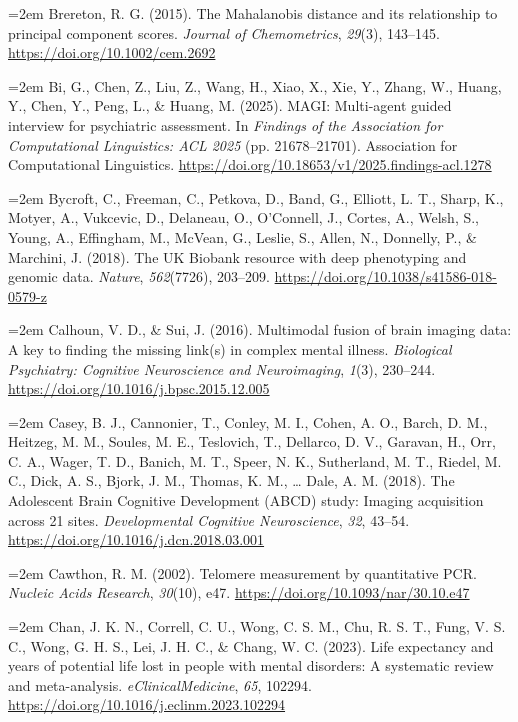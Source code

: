 \documentclass[11pt,a4paper,twoside]{article}
\begin{document}
\hangindent=2em Brereton, R. G. (2015). The Mahalanobis distance and its relationship to principal component scores. \textit{Journal of Chemometrics}, \textit{29}(3), 143--145. \url{https://doi.org/10.1002/cem.2692}

\hangindent=2em Bi, G., Chen, Z., Liu, Z., Wang, H., Xiao, X., Xie, Y., Zhang, W., Huang, Y., Chen, Y., Peng, L., \& Huang, M. (2025). MAGI: Multi-agent guided interview for psychiatric assessment. In \textit{Findings of the Association for Computational Linguistics: ACL 2025} (pp. 21678--21701). Association for Computational Linguistics. \url{https://doi.org/10.18653/v1/2025.findings-acl.1278}

\hangindent=2em Bycroft, C., Freeman, C., Petkova, D., Band, G., Elliott, L. T., Sharp, K., Motyer, A., Vukcevic, D., Delaneau, O., O'Connell, J., Cortes, A., Welsh, S., Young, A., Effingham, M., McVean, G., Leslie, S., Allen, N., Donnelly, P., \& Marchini, J. (2018). The UK Biobank resource with deep phenotyping and genomic data. \textit{Nature}, \textit{562}(7726), 203--209. \url{https://doi.org/10.1038/s41586-018-0579-z}

\hangindent=2em Calhoun, V. D., \& Sui, J. (2016). Multimodal fusion of brain imaging data: A key to finding the missing link(s) in complex mental illness. \textit{Biological Psychiatry: Cognitive Neuroscience and Neuroimaging}, \textit{1}(3), 230--244. \url{https://doi.org/10.1016/j.bpsc.2015.12.005}

\hangindent=2em Casey, B. J., Cannonier, T., Conley, M. I., Cohen, A. O., Barch, D. M., Heitzeg, M. M., Soules, M. E., Teslovich, T., Dellarco, D. V., Garavan, H., Orr, C. A., Wager, T. D., Banich, M. T., Speer, N. K., Sutherland, M. T., Riedel, M. C., Dick, A. S., Bjork, J. M., Thomas, K. M., \ldots{} Dale, A. M. (2018). The Adolescent Brain Cognitive Development (ABCD) study: Imaging acquisition across 21 sites. \textit{Developmental Cognitive Neuroscience}, \textit{32}, 43--54. \url{https://doi.org/10.1016/j.dcn.2018.03.001}

\hangindent=2em Cawthon, R. M. (2002). Telomere measurement by quantitative PCR. \textit{Nucleic Acids Research}, \textit{30}(10), e47. \url{https://doi.org/10.1093/nar/30.10.e47}

\hangindent=2em Chan, J. K. N., Correll, C. U., Wong, C. S. M., Chu, R. S. T., Fung, V. S. C., Wong, G. H. S., Lei, J. H. C., \& Chang, W. C. (2023). Life expectancy and years of potential life lost in people with mental disorders: A systematic review and meta-analysis. \textit{eClinicalMedicine}, \textit{65}, 102294. \url{https://doi.org/10.1016/j.eclinm.2023.102294}
\end{document}
